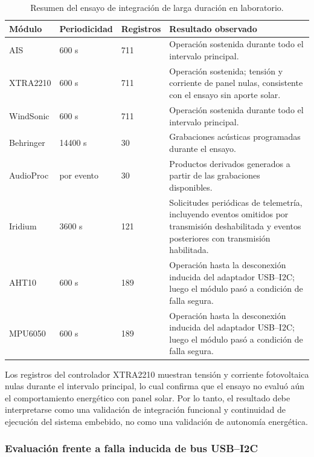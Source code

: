 \begin{table}[htpb]
\centering
\small
\caption{Resumen del ensayo de integración de larga duración en laboratorio.}
\label{tab:ensayo_larga_duracion}

\begin{tabularx}{\textwidth}{p{} p{} p{} X}
\toprule
\textbf{Módulo} & \textbf{Periodicidad} & \textbf{Registros} & \textbf{Resultado observado} \\
\midrule
AIS         & 600 s  & 711 & Operación sostenida durante todo el intervalo principal. \\
XTRA2210    & 600 s  & 711 & Operación sostenida; tensión y corriente de panel nulas, consistente con el ensayo sin aporte solar. \\
WindSonic   & 600 s  & 711 & Operación sostenida durante todo el intervalo principal. \\
Behringer   & 14400 s & 30 & Grabaciones acústicas programadas durante el ensayo. \\
AudioProc   & por evento & 30 & Productos derivados generados a partir de las grabaciones disponibles. \\
Iridium     & 3600 s & 121 & Solicitudes periódicas de telemetría, incluyendo eventos omitidos por transmisión deshabilitada y eventos posteriores con transmisión habilitada. \\
AHT10       & 600 s  & 189 & Operación hasta la desconexión inducida del adaptador USB--I2C; luego el módulo pasó a condición de falla segura. \\
MPU6050     & 600 s  & 189 & Operación hasta la desconexión inducida del adaptador USB--I2C; luego el módulo pasó a condición de falla segura. \\
\bottomrule
\end{tabularx}
\end{table}

Los registros del controlador XTRA2210 muestran tensión y corriente fotovoltaica nulas durante el intervalo principal, lo cual confirma que el ensayo no evaluó aún el comportamiento energético con panel solar. Por lo tanto, el resultado debe interpretarse como una validación de integración funcional y continuidad de ejecución del sistema embebido, no como una validación de autonomía energética.

\subsubsection{Evaluación frente a falla inducida de bus USB--I2C}

